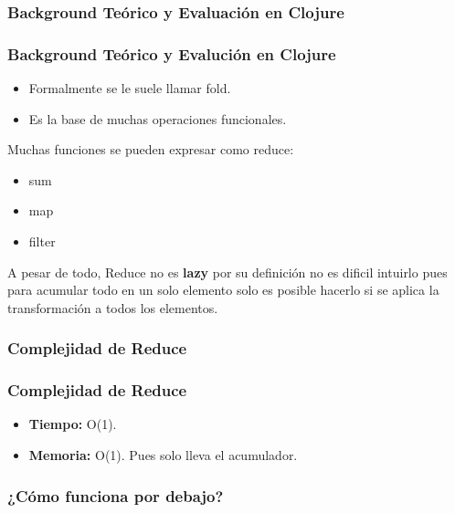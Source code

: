 \documentclass{beamer}
\begin{document}
\subsubsection{Background Teórico y Evaluación en Clojure}
\begin{frame}[fragile]
    \frametitle{Background Teórico y Evalución en Clojure}
    \begin{itemize}
        \item Formalmente se le suele llamar fold.
        \item Es la base de muchas operaciones funcionales.
        
    \end{itemize}
    Muchas funciones se pueden expresar como reduce:
    \begin{itemize}
        \item sum
        \item map
        \item filter
    \end{itemize}
    A pesar de todo, Reduce no es \textbf{lazy} por su definición no es dificil intuirlo
    pues para acumular todo en un solo elemento solo es posible hacerlo si se aplica la transformación a todos los elementos.
\end{frame}

\subsubsection{Complejidad de Reduce}
\begin{frame}[fragile]
    \frametitle{Complejidad de Reduce}

\begin{itemize}
    \item \textbf{Tiempo: } O(1).
    \item \textbf{Memoria: } O(1). Pues solo lleva el acumulador.
\end{itemize}
\end{frame}

\subsubsection{¿Cómo funciona por debajo?}
    
\end{document}
